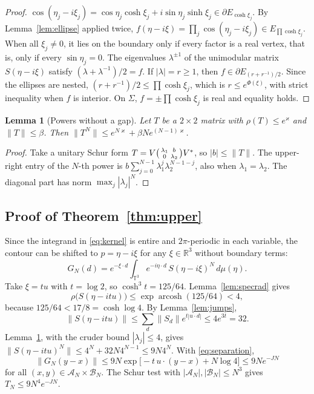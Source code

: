 \documentclass[11pt]{amsart}
\newtheorem{lemma}[theorem]{Lemma}
\theoremstyle{definition}
\theoremstyle{remark}
\newcommand{\R}{\mathbb{R}}
\newcommand{\T}{\mathbb{T}}
\newcommand{\cA}{\mathcal{A}}
\newcommand{\cB}{\mathcal{B}}
\newcommand{\arcosh}{\operatorname{arcosh}}
\begin{document}
\begin{proof}
$\cos(\eta_j-i\xi_j)=\cos\eta_j\cosh\xi_j+i\sin\eta_j\sinh\xi_j\in\partial E_{\cosh\xi_j}$.
By Lemma~\ref{lem:ellipse} applied twice,
$f(\eta-i\xi)=\prod_j\cos(\eta_j-i\xi_j)\in E_{\prod\cosh\xi_j}$.  When all
$\xi_j\ne0$, it lies on the boundary only if every factor is a real vertex,
that is, only if every $\sin\eta_j=0$.  The eigenvalues $\lambda^{\pm1}$ of
the unimodular matrix $S(\eta-i\xi)$ satisfy $(\lambda+\lambda^{-1})/2=f$.
If $|\lambda|=r\ge1$, then $f\in\partial E_{(r+r^{-1})/2}$.  Since the
ellipses are nested, $(r+r^{-1})/2\le\prod\cosh\xi_j$, which is
$r\le e^{\Phi(\xi)}$, with strict inequality when $f$ is interior.  On
$\Sigma$, $f=\pm\prod\cosh\xi_j$ is real and equality holds.
\end{proof}

\begin{lemma}[Powers without a gap]\label{lem:schur}
Let $T$ be a $2\times2$ matrix with $\rho(T)\le e^{\varkappa}$ and
$\|T\|\le\beta$.  Then $\|T^N\|\le e^{N\varkappa}+\beta Ne^{(N-1)\varkappa}$.
\end{lemma}

\begin{proof}
Take a unitary Schur form $T=V\begin{psmallmatrix}\lambda_1&b\\0&\lambda_2\end{psmallmatrix}V^*$,
so $|b|\le\|T\|$.  The upper-right entry of the $N$-th power is
$b\sum_{j=0}^{N-1}\lambda_1^j\lambda_2^{N-1-j}$, also when
$\lambda_1=\lambda_2$.  The diagonal part has norm
$\max_j|\lambda_j|^N$.
\end{proof}

\subsection{Proof of Theorem~\ref{thm:upper}}
Since the integrand in \eqref{eq:kernel} is entire and $2\pi$-periodic in
each variable, the contour can be shifted to $p=\eta-i\xi$ for any
$\xi\in\R^3$ without boundary terms:
\begin{equation}\label{eq:tilt}
G_N(d)=e^{-\xi\cdot d}\int_{\T^3}e^{-i\eta\cdot d}\,S(\eta-i\xi)^N\,d\mu(\eta).
\end{equation}
Take $\xi=tu$ with $t=\log2$, so $\cosh^3t=125/64$.  Lemma~\ref{lem:specrad}
gives
\[
\rho\bigl(S(\eta-itu)\bigr)\le\exp\arcosh(125/64)<4,
\]
because $125/64<17/8=\cosh\log4$.  By Lemma~\ref{lem:jumps},
\[
\|S(\eta-itu)\|\le\sum_d\|S_d\|e^{t|u\cdot d|}\le4e^{3t}=32 .
\]
Lemma~\ref{lem:schur}, with the cruder bound $|\lambda_j|\le4$, gives
$\|S(\eta-itu)^N\|\le4^N+32N4^{N-1}\le9N4^N$.  With
\eqref{eq:separation},
\[
\|G_N(y-x)\|\le9N\exp\bigl[-t\,u\cdot(y-x)+N\log4\bigr]\le9Ne^{-JN}
\]
for all $(x,y)\in\cA_N\times\cB_N$.  The Schur test with $|\cA_N|,|\cB_N|\le N^3$
gives $T_N\le9N^4e^{-JN}$.
\end{document}
